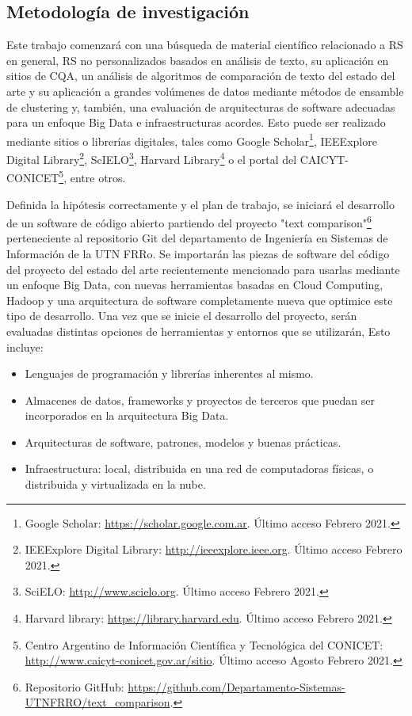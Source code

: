 \subsection{Metodología de investigación}
Este trabajo comenzará con una búsqueda de material científico relacionado a RS en general, RS no personalizados basados en análisis de texto, su aplicación en sitios de CQA, un análisis de algoritmos de comparación de texto del estado del arte y su aplicación a grandes volúmenes de datos mediante métodos de ensamble de clustering y, también, una evaluación de arquitecturas de software adecuadas para un enfoque Big Data e infraestructuras acordes. Esto puede ser realizado mediante sitios o librerías digitales, tales como Google Scholar\footnote{Google Scholar: \url{https://scholar.google.com.ar}. Último acceso Febrero 2021.}, IEEExplore Digital Library\footnote{IEEExplore Digital Library: \url{http://ieeexplore.ieee.org}. Último acceso Febrero 2021.}, ScIELO\footnote{SciELO: \url{http://www.scielo.org}. Último acceso Febrero 2021.}, Harvard Library\footnote{Harvard library: \url{https://library.harvard.edu}. Último acceso Febrero 2021.} o el portal del CAICYT-CONICET\footnote{Centro Argentino de Información Científica y Tecnológica del CONICET: \url{http://www.caicyt-conicet.gov.ar/sitio}. Último acceso Agosto Febrero 2021.}, entre otros.

\bigskip Definida la hipótesis correctamente y el plan de trabajo, se iniciará el desarrollo de un software de código abierto partiendo del proyecto "text comparison"\footnote{Repositorio GitHub: \url{https://github.com/Departamento-Sistemas-UTNFRRO/text_comparison}.} perteneciente al repositorio Git del departamento de Ingeniería en Sistemas de Información de la UTN FRRo. Se importarán las piezas de software del código del proyecto del estado del arte recientemente mencionado para usarlas mediante un enfoque Big Data, con nuevas herramientas basadas en Cloud Computing, Hadoop y una arquitectura de software completamente nueva que optimice este tipo de desarrollo. Una vez que se inicie el desarrollo del proyecto, serán evaluadas distintas opciones de herramientas y entornos que se utilizarán, Esto incluye:

\begin{itemize}
	\item Lenguajes de programación y librerías inherentes al mismo.
	\item Almacenes de datos, frameworks y proyectos de terceros que puedan ser incorporados en la arquitectura Big Data.
	\item Arquitecturas de software, patrones, modelos y buenas prácticas.
	\item Infraestructura: local, distribuida en una red de computadoras físicas, o distribuida y virtualizada en la nube.
\end{itemize}


